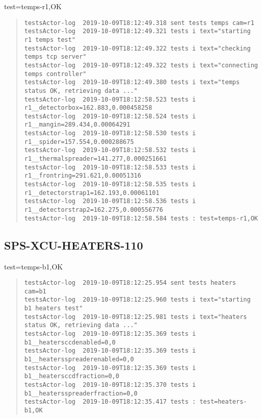 \noindent test=temps-r1,OK

\begin{quote}
\begin{tiny}
\begin{verbatim}
testsActor-log  2019-10-09T18:12:49.318 sent tests temps cam=r1
testsActor-log  2019-10-09T18:12:49.321 tests i text="starting r1 temps test"
testsActor-log  2019-10-09T18:12:49.322 tests i text="checking temps tcp server"
testsActor-log  2019-10-09T18:12:49.322 tests i text="connecting temps controller"
testsActor-log  2019-10-09T18:12:49.380 tests i text="temps status OK, retrieving data ..."
testsActor-log  2019-10-09T18:12:58.523 tests i r1__detectorbox=162.883,0.000458258
testsActor-log  2019-10-09T18:12:58.524 tests i r1__mangin=289.434,0.00064291
testsActor-log  2019-10-09T18:12:58.530 tests i r1__spider=157.554,0.000288675
testsActor-log  2019-10-09T18:12:58.532 tests i r1__thermalspreader=141.277,0.000251661
testsActor-log  2019-10-09T18:12:58.533 tests i r1__frontring=291.621,0.00051316
testsActor-log  2019-10-09T18:12:58.535 tests i r1__detectorstrap1=162.193,0.00061101
testsActor-log  2019-10-09T18:12:58.536 tests i r1__detectorstrap2=162.275,0.000556776
testsActor-log  2019-10-09T18:12:58.584 tests : test=temps-r1,OK
\end{verbatim}
\end{tiny}
\end{quote}

\subsection{SPS-XCU-HEATERS-110}
\label{sec:tc-110}

test=temps-b1,OK

\begin{quote}
\begin{tiny}
\begin{verbatim}
testsActor-log  2019-10-09T18:12:25.954 sent tests heaters cam=b1
testsActor-log  2019-10-09T18:12:25.960 tests i text="starting b1 heaters test"
testsActor-log  2019-10-09T18:12:25.981 tests i text="heaters status OK, retrieving data ..."
testsActor-log  2019-10-09T18:12:35.369 tests i b1__heatersccdenabled=0,0
testsActor-log  2019-10-09T18:12:35.369 tests i b1__heatersspreaderenabled=0,0
testsActor-log  2019-10-09T18:12:35.369 tests i b1__heatersccdfraction=0,0
testsActor-log  2019-10-09T18:12:35.370 tests i b1__heatersspreaderfraction=0,0
testsActor-log  2019-10-09T18:12:35.417 tests : test=heaters-b1,OK
\end{verbatim}
\end{tiny}
\end{quote}

